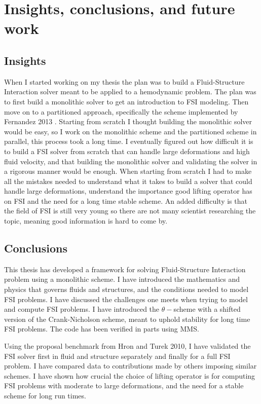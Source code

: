 \chapter{Insights, conclusions, and future work}
\section{Insights}
When I started working on my thesis the plan was to build a Fluid-Structure Interaction solver meant to be applied to a hemodynamic problem. The plan was to first build a monolithic solver to get an introduction to FSI modeling. Then move on to a partitioned approach, specifically the scheme implemented by Fernandez 2013 \cite{Fernandez2013}. Starting from scratch I thought building the monolithic solver would be easy, so I work on the monolithic scheme and the partitioned scheme in parallel, this process took a long time. I eventually figured out how difficult it is to build a FSI solver from scratch that can handle large deformations and high fluid velocity, and that building the monolithic solver and validating the solver in a rigorous manner would be enough. When starting from scratch I had to make all the mistakes needed to understand what it takes to build a solver that could handle large deformations, understand the importance good lifting operator has on FSI and the need for a long time stable scheme. An added difficulty is that the field of FSI is still very young so there are not many scientist researching the topic, meaning good information is hard to come by.
\section{Conclusions}
This thesis has developed a framework for solving Fluid-Structure Interaction problem using a monolithic scheme. I have introduced the mathematics and physics that governs fluids and structures, and the conditions needed to model FSI problems. I have discussed the challenges one meets when trying to model and compute FSI problems. I have introduced the $\theta-$scheme with a shifted version of the Crank-Nicholson scheme, meant to uphold stability for long time FSI problems. The code has been verified in parts using MMS. \newline

Using the proposal benchmark from Hron and Turek 2010, I have validated the FSI solver first in fluid and structure separately and finally for a full FSI problem. I have compared data to contributions made by others imposing similar schemes. I have shown how crucial the choice of lifting operator is for computing FSI problems with moderate to large deformations, and the need for a stable scheme for long run times.

